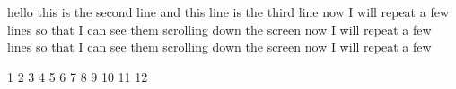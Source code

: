 hello
this is the second line
and this line is the third line
now I will repeat a few
lines so that I can see them
scrolling down the screen
now I will repeat a few
lines so that I can see them
scrolling down the screen
now I will repeat a few

1
2
3
4
5
6
7
8
9
10
11
12
